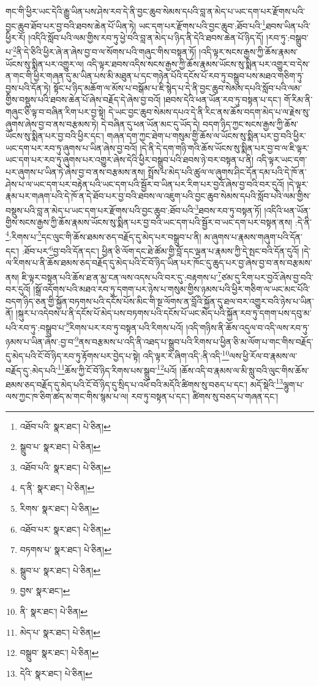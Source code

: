 གང་གི་ཕྱིར་ཡང་དེའི་རྒྱུ་ཡིན་པས་ཤེས་རབ་དེ་ནི་བྱང་ཆུབ་སེམས་དཔའི་བླ་ན་མེད་པ་ཡང་དག་པར་རྫོགས་པའི་བྱང་ཆུབ་ཐོབ་པར་བྱ་བའི་ཐབས་ཆེན་པོ་ཡིན་ཏེ། ཡང་དག་པར་རྫོགས་པའི་བྱང་ཆུབ་:ཐོབ་པའི་\footnote{འཐོབ་པའི་  སྣར་ཐང་།  པེ་ཅིན། }ཐབས་ཡིན་པའི་ཕྱིར་རོ། །འདིའི་སློབ་པའི་ལམ་གྱིས་རབ་ཏུ་ཕྱེ་བའི་བླ་ན་མེད་པ་ཉིད་ནི་དེའི་ཐབས་ཆེན་པོ་ཉིད་དོ། །རབ་ཏུ་:བསྒྲུབ་པ་\footnote{སྒྲུབ་པ་  སྣར་ཐང་།  པེ་ཅིན། }ནི་དེ་ཅིའི་ཕྱིར་ཞེ་ན་ཞེས་བྱ་བ་ལ་སོགས་པའི་གཞུང་གིས་བསྟན་ཏོ། །འདི་ལྟར་སངས་རྒྱས་ཀྱི་ཆོས་རྣམས་ཡོངས་སུ་སྨིན་པར་འགྱུར་ལ། འདི་ལྟར་ཐབས་འདིས་སངས་རྒྱས་ཀྱི་ཆོས་རྣམས་ཡོངས་སུ་སྨིན་པར་འགྱུར་བ་དེས་ན་གང་གི་ཕྱིར་གཞན་དུ་མ་ཡིན་པས་མི་མཐུན་པ་དང་གཉེན་པོའི་དངོས་པོ་རབ་ཏུ་བསྒྲུབ་པས་མཐའ་གཅིག་ཏུ་བྱས་པའི་དོན་ཏེ། སྟོང་པ་ཉིད་མཆོག་ལ་མོས་པ་བསྒོམ་པ་ཇི་སྙེད་པ་དེ་ནི་བྱང་ཆུབ་སེམས་དཔའི་སློབ་པའི་ལམ་གྱིས་བསྡུས་པའི་ཐབས་ཆེན་པོ་ཞེས་བརྗོད་དེ་ཞེས་བྱ་བའོ། །ཐབས་དེའི་ཕན་ཡོན་རབ་ཏུ་བསྟན་པ་དང་། གོ་རིམ་ནི་གཞུང་ཅི་ལྟ་བ་བཞིན་རིག་པར་བྱ་སྟེ། དེ་ཡང་བྱང་ཆུབ་སེམས་དཔའ་དེ་ནི་རིང་ནས་ཆོས་བདག་མེད་པ་ལ་རྗེས་སུ་ཞུགས་ཞེས་བྱ་བ་ནས་བརྩམས་ཏེ། དེ་བཞིན་དུ་ཕན་ཡོན་མང་དུ་ཡོད་དེ། བདག་ཉིད་ཀྱང་སངས་རྒྱས་ཀྱི་ཆོས་ཡོངས་སུ་སྨིན་པར་བྱ་བའི་ཕྱིར་དང་། གཞན་དག་ཀྱང་ཐེག་པ་གསུམ་གྱི་ཆོས་ལ་ཡོངས་སུ་སྨིན་པར་བྱ་བའི་ཕྱིར་ཡང་དག་པར་རབ་ཏུ་ཞུགས་པ་ཡིན་ཞེས་བྱ་བའོ། །དེ་ནི་དེ་དག་གཉི་གའི་ཆོས་ཡོངས་སུ་སྨིན་པར་བྱ་བ་ལ་ཇི་ལྟར་ཡང་དག་པར་རབ་ཏུ་ཞུགས་པར་འགྱུར་ཞེས་དེའི་ཕྱིར་བསྒྲུབ་པའི་ཐབས་ཉེ་བར་བསྟན་པ་ནི། འདི་ལྟར་ཡང་དག་པར་ཞུགས་པ་ཡིན་ཏེ་ཞེས་བྱ་བ་ནས་བརྩམས་ནས། སྤྲོས་པ་མེད་པའི་ཚུལ་ལ་ཞུགས་ཤིང་དོན་དམ་པའི་དེ་ཁོ་ན་ཤེས་པ་ལ་ཡང་དག་པར་བརྟེན་པའི་ཡང་དག་པའི་སྦྱོར་བ་ཡིན་པར་རིག་པར་བྱའོ་ཞེས་བྱ་བའི་བར་དུའོ། །དེ་ལྟར་རྣམ་པར་གཞག་པའི་དེ་ཁོ་ན་དེ་ཐོབ་པར་བྱ་བའི་ཐབས་ལ་འཇུག་པའི་བྱང་ཆུབ་སེམས་དཔའི་སློབ་པའི་ལམ་གྱིས་བསྡུས་པའི་བླ་ན་མེད་པ་ཡང་དག་པར་རྫོགས་པའི་བྱང་ཆུབ་:ཐོབ་པའི་\footnote{འཐོབ་པའི་  སྣར་ཐང་།  པེ་ཅིན། }ཐབས་རབ་ཏུ་བསྟན་ཏོ། །འདིའི་ཕན་ཡོན་གྱིས་སངས་རྒྱས་ཀྱི་ཆོས་རྣམས་ཡོངས་སུ་སྨིན་པར་བྱ་བའི་ཡང་དག་པའི་སྦྱོར་བ་ཡང་དག་པར་བསྟན་ནས། :དེ་ནི་\footnote{ད་ནི་  སྣར་ཐང་།  པེ་ཅིན། }:རིགས་པ་\footnote{རིགས་  སྣར་ཐང་།  པེ་ཅིན། }དང་ལུང་གི་ཆོས་ཐམས་ཅད་བརྗོད་དུ་མེད་པར་བསྒྲུབ་པ་ནི། མ་ཞུགས་པ་རྣམས་གཞུག་པའི་དོན་དང་། :ཐོབ་པར་\footnote{འཐོབ་པར་  སྣར་ཐང་།  པེ་ཅིན། }བྱ་བའི་དོན་དང་། ཕྱིན་ཅི་ལོག་དང་ཐེ་ཚོམ་གྱི་བློ་དང་ལྡན་པ་རྣམས་ཀྱི་དེ་སྤང་བའི་དོན་དུའོ། །དེ་ལ་རིགས་པ་ནི་ཆོས་ཐམས་ཅད་བརྗོད་དུ་མེད་པའི་ངོ་བོ་ཉིད་ཡིན་པར་ཁོང་དུ་ཆུད་པར་བྱ་ཞེས་བྱ་བ་ནས་བརྩམས་ནས། ཇི་ལྟར་བསྟན་པའི་ཆོས་ཐ་ན་མྱ་ངན་ལས་འདས་པའི་བར་དུ་:བརྟགས་པ་\footnote{བཏགས་པ་  སྣར་ཐང་།  པེ་ཅིན། }ཙམ་དུ་རིག་པར་བྱའོ་ཞེས་བྱ་བའི་བར་དུའོ། །སྒྲོ་འདོགས་པའི་མཐའ་རབ་ཏུ་དགག་པར་ཉེས་པ་གསུམ་གྱིས་ཉམས་པའི་ཕྱིར་གཅིག་ལ་ཡང་མང་པོའི་བདག་ཉིད་ཅན་གྱི་སྐྱོན་བཏགས་པའི་དངོས་པོས་མིང་གི་སྔ་ལོགས་ན་བློའི་སྐྱོན་དུ་ཐལ་བར་འགྱུར་བའི་ཉེས་པ་ཡིན་ནོ། །སྐུར་པ་འདེབས་པ་ནི་དངོས་པོ་མེད་པས་བཏགས་པའི་དངོས་པོ་ཡང་མེད་པའི་སྐྱོན་རབ་ཏུ་དགག་པས་དབུ་མ་པའི་རབ་ཏུ་:བསྒྲུབ་པ་\footnote{སྒྲུབ་པ་  སྣར་ཐང་།  པེ་ཅིན། }རིགས་པར་རབ་ཏུ་བསྟན་པའི་རིགས་པའོ། །འདི་གཉིས་ནི་ཆོས་འདུལ་བ་འདི་ལས་རབ་ཏུ་ཉམས་པ་ཡིན་ཞེས་:བྱ་བ་\footnote{བྱས་  སྣར་ཐང་། }ནས་བརྩམས་པ་འདི་ནི་འཐད་པ་སྒྲུབ་པའི་རིགས་པ་ཕྱིན་ཅི་མ་ལོག་པ་གང་གིས་བརྗོད་དུ་མེད་པའི་ངོ་བོ་ཉིད་རབ་ཏུ་རྟོགས་པར་བྱེད་པ་སྟེ། འདི་ལྟར་རེ་ཞིག་འདི་:ནི་འདི་\footnote{ནི་  སྣར་ཐང་།  པེ་ཅིན། }ལས་ཕྱི་རོལ་བ་རྣམས་ལ་བརྗོད་དུ་:མེད་པའི་\footnote{མེད་པ་  སྣར་ཐང་།  པེ་ཅིན། }ཆོས་ཀྱི་ངོ་བོ་ཉིད་རིགས་པས་སྒྲུབ་\footnote{བསྒྲུབ་  སྣར་ཐང་།  པེ་ཅིན། }པའོ། །ཆོས་འདི་བ་རྣམས་ལ་མི་སླུ་བའི་ལུང་གིས་ཆོས་ཐམས་ཅད་བརྗོད་དུ་མེད་པའི་ངོ་བོ་ཉིད་དུ་སྲིད་པ་འཕོ་བའི་མདོའི་ཚིགས་སུ་བཅད་པ་དང་། མདོ་སྡེའི་\footnote{དེའི་  སྣར་ཐང་།  པེ་ཅིན། }ལྷུག་པ་ལས་ཀྱང་ཁ་ཅིག་ཚད་མ་གང་གིས་སྙམ་པ་ལ། རབ་ཏུ་བསྟན་པ་དང་། ཚིགས་སུ་བཅད་པ་གཞན་དང་། 
